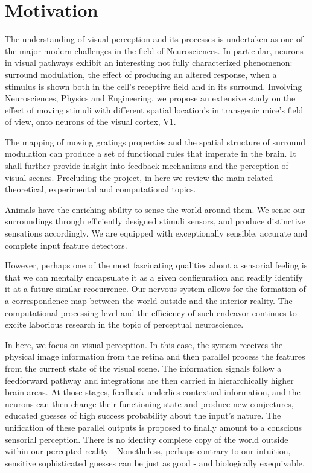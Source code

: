 \section{Motivation}
\label{sec:int_motivation}

The understanding of visual perception and its processes is undertaken as one of the major modern challenges in the field of Neurosciences. In particular, neurons in visual pathways exhibit an interesting not fully characterized phenomenon: surround modulation, the effect of producing an altered response, when a stimulus is shown both in the cell's receptive field and in its surround. Involving Neurosciences, Physics and Engineering, we propose an extensive study on the effect of moving stimuli with different spatial location's in transgenic mice's field of view, onto neurons of the visual cortex, V1.  

The mapping of moving gratings properties and the spatial structure of surround modulation can produce a set of functional rules that imperate in the brain. It shall further provide insight into feedback mechanisms and the perception of visual scenes. Precluding the project, in here we review the main related theoretical, experimental and computational topics.

Animals have the enriching ability to sense the world around them. We sense our surroundings through efficiently designed stimuli sensors, and produce distinctive sensations accordingly. We are equipped with exceptionally sensible, accurate and complete input feature detectors.

However, perhaps one of the most fascinating qualities about a sensorial feeling is that we can mentally encapsulate it as a given configuration and readily identify it at a future similar reocurrence. Our nervous system allows for the formation of a correspondence map between the world outside and the interior reality. The computational processing level and the efficiency of such endeavor continues to excite laborious research in the topic of perceptual neuroscience.

In here, we focus on visual perception. In this case, the system receives the physical image information from the retina and then parallel process the features from the current state of the visual scene. The information signals follow a feedforward pathway and integrations are then carried in hierarchically higher brain areas. At those stages, feedback underlies contextual information, and the neurons can then change their functioning state and produce new conjectures, educated guesses of high success probability about the input's nature.
The unification of these parallel outputs is proposed to finally amount to a conscious sensorial perception.
There is no identity complete copy of the world outside within our percepted reality - Nonetheless, perhaps contrary to our intuition, sensitive sophisticated guesses can be just as good - and biologically exequivable.

